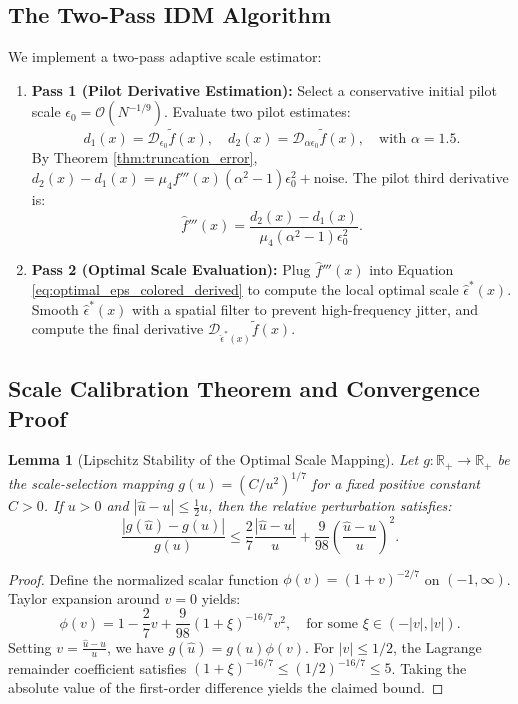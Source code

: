 \documentclass[11pt,a4paper]{article}
\newtheorem{lemma}[theorem]{Lemma}
\theoremstyle{definition}
\begin{document}
\subsection{The Two-Pass IDM Algorithm}
We implement a two-pass adaptive scale estimator:
\begin{enumerate}
    \item \textbf{Pass 1 (Pilot Derivative Estimation):} Select a conservative initial pilot scale $\epsilon_0 = \mathcal{O}(N^{-1/9})$. Evaluate two pilot estimates:
    \begin{equation}
    d_1(x) = \mathcal{D}_{\epsilon_0} \tilde{f}(x), \quad d_2(x) = \mathcal{D}_{\alpha \epsilon_0} \tilde{f}(x), \quad \text{with } \alpha = 1.5.
    \end{equation}
    By Theorem \ref{thm:truncation_error}, $d_2(x) - d_1(x) = \mu_4 f'''(x)(\alpha^2 - 1)\epsilon_0^2 + \text{noise}$. The pilot third derivative is:
    \begin{equation}
    \hat{f}'''(x) = \frac{d_2(x) - d_1(x)}{\mu_4 (\alpha^2 - 1) \epsilon_0^2}.
    \end{equation}
    \item \textbf{Pass 2 (Optimal Scale Evaluation):} Plug $\hat{f}'''(x)$ into Equation \eqref{eq:optimal_eps_colored_derived} to compute the local optimal scale $\hat{\epsilon}^*(x)$. Smooth $\hat{\epsilon}^*(x)$ with a spatial filter to prevent high-frequency jitter, and compute the final derivative $\mathcal{D}_{\hat{\epsilon}^*(x)}\tilde{f}(x)$.
\end{enumerate}

\subsection{Scale Calibration Theorem and Convergence Proof}

\begin{lemma}[Lipschitz Stability of the Optimal Scale Mapping]
\label{lem:scale_stability}
Let $g: \mathbb{R}_+ \to \mathbb{R}_+$ be the scale-selection mapping $g(u) = (C / u^2)^{1/7}$ for a fixed positive constant $C > 0$. If $u > 0$ and $|\hat{u} - u| \le \frac{1}{2} u$, then the relative perturbation satisfies:
\begin{equation}
\frac{|g(\hat{u}) - g(u)|}{g(u)} \le \frac{2}{7} \frac{|\hat{u} - u|}{u} + \frac{9}{98} \left( \frac{\hat{u} - u}{u} \right)^2.
\end{equation}
\end{lemma}

\begin{proof}
Define the normalized scalar function $\phi(v) = (1 + v)^{-2/7}$ on $(-1, \infty)$. Taylor expansion around $v = 0$ yields:
\begin{equation}
\phi(v) = 1 - \frac{2}{7} v + \frac{9}{98} (1 + \xi)^{-16/7} v^2, \quad \text{for some } \xi \in (-|v|, |v|).
\end{equation}
Setting $v = \frac{\hat{u} - u}{u}$, we have $g(\hat{u}) = g(u) \phi(v)$. For $|v| \le 1/2$, the Lagrange remainder coefficient satisfies $(1 + \xi)^{-16/7} \le (1/2)^{-16/7} \le 5$. Taking the absolute value of the first-order difference yields the claimed bound.
\end{proof}
\end{document}
